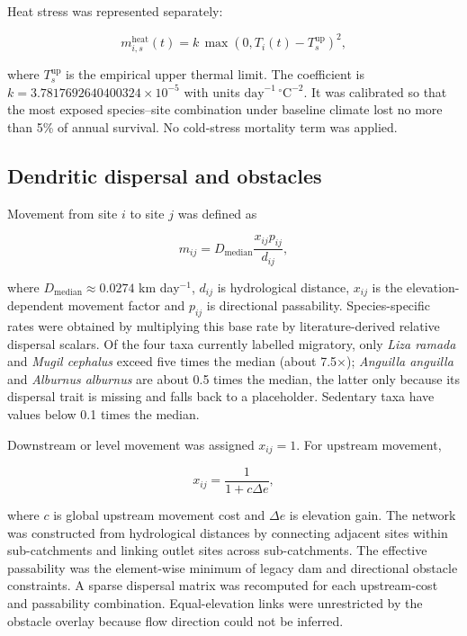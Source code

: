 \documentclass[11pt,a4paper]{article}
\begin{document}
Heat stress was represented separately:

\begin{equation}
m^{\mathrm{heat}}_{i,s}(t) = k\,\max\left(0,T_i(t)-T^{\mathrm{up}}_s\right)^2,
\end{equation}

where $T^{\mathrm{up}}_s$ is the empirical upper thermal limit. The coefficient is
$k=3.7817692640400324\times10^{-5}$ with units
$\mathrm{day}^{-1}\,{}^\circ\mathrm{C}^{-2}$. It was calibrated so that the most exposed species--site combination under baseline climate lost no more than 5\% of annual survival. No cold-stress mortality term was applied.

\subsection{Dendritic dispersal and obstacles}

Movement from site $i$ to site $j$ was defined as

\begin{equation}
m_{ij}=D_{\mathrm{median}}\frac{x_{ij}p_{ij}}{d_{ij}},
\end{equation}

where $D_{\mathrm{median}}\approx0.0274$ km day$^{-1}$, $d_{ij}$ is hydrological distance, $x_{ij}$ is the elevation-dependent movement factor and $p_{ij}$ is directional passability. Species-specific rates were obtained by multiplying this base rate by literature-derived relative dispersal scalars. Of the four taxa currently labelled migratory, only \textit{Liza ramada} and \textit{Mugil cephalus} exceed five times the median (about 7.5$\times$); \textit{Anguilla anguilla} and \textit{Alburnus alburnus} are about 0.5 times the median, the latter only because its dispersal trait is missing and falls back to a placeholder. Sedentary taxa have values below 0.1 times the median.

Downstream or level movement was assigned $x_{ij}=1$. For upstream movement,

\begin{equation}
x_{ij}=\frac{1}{1+c\Delta e},
\end{equation}

where $c$ is global upstream movement cost and $\Delta e$ is elevation gain. The network was constructed from hydrological distances by connecting adjacent sites within sub-catchments and linking outlet sites across sub-catchments. The effective passability was the element-wise minimum of legacy dam and directional obstacle constraints. A sparse dispersal matrix was recomputed for each upstream-cost and passability combination. Equal-elevation links were unrestricted by the obstacle overlay because flow direction could not be inferred.
\end{document}
